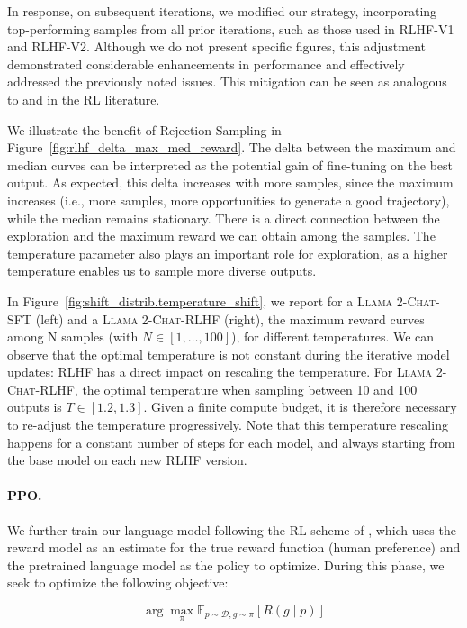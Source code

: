 \documentclass{article}
\newcommand{\modelname}{\textsc{Llama 2-Chat}\xspace}
\begin{document}
In response, on subsequent iterations, we modified our strategy, incorporating top-performing samples from all prior iterations, such as those used in RLHF-V1 and RLHF-V2. Although we do not present specific figures, this adjustment demonstrated considerable enhancements in performance and effectively addressed the previously noted issues. This mitigation can be seen as analogous to \cite{synnaeve2019growing} and  \cite{vinyals2019grandmaster} in the RL literature.

We illustrate the benefit of Rejection Sampling in Figure~\ref{fig:rlhf_delta_max_med_reward}. The delta between the maximum and median curves can be interpreted as the potential gain of fine-tuning on the best output. As expected, this delta increases with more samples, since the maximum increases (i.e., more samples, more opportunities to generate a good trajectory), while the median remains stationary. There is a direct connection between the exploration and the maximum reward we can obtain among the samples. The temperature parameter also plays an important role for exploration, as a higher temperature enables us to sample more diverse outputs.

In Figure~\ref{fig:shift_distrib.temperature_shift}, we report for a \modelname-SFT (left) and a \modelname-RLHF (right), the maximum reward curves among N samples (with $N \in [1, \ldots, 100]$), for different temperatures. We can observe that the optimal temperature is not constant during the iterative model updates: RLHF has a direct impact on rescaling the temperature. For \modelname-RLHF, the optimal temperature when sampling between 10 and 100 outputs is $T \in [1.2, 1.3]$. Given a finite compute budget, it is therefore necessary to re-adjust the temperature progressively. Note that this temperature rescaling happens for a constant number of steps for each model, and always starting from the base model on each new RLHF version. 

\paragraph{PPO.}


We further train our language model following the RL scheme of \cite{stienon2020learning}, which uses the reward model as an estimate for the true reward function (human preference) and the pretrained language model as the policy to optimize. During this phase, we seek to optimize the following objective:

\begin{equation}
   \arg \max _\pi \mathbb{E}_{p \sim \mathcal{D}, g \sim \pi}[R(g \mid p)]
\end{equation}
\end{document}
